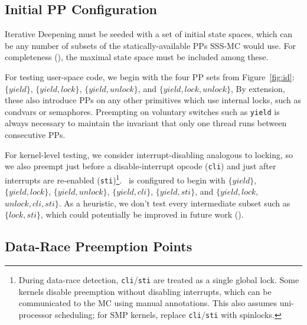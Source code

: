 
\subsection{Initial PP Configuration}
\label{sec:initial-pp}

Iterative Deepening must be seeded with a set of initial state spaces,
which can be any number of subsets of the statically-available PPs SSS-MC would use.
For completeness (\sect{\ref{sec:totalverif}}), the maximal state space must be included among these.

For testing user-space code, we begin with the four PP sets from Figure~\ref{fig:id}:
$\{yield\}$,
$\{yield,lock\}$,
$\{yield,unlock\}$,
and $\{yield,lock,unlock\}$,
By extension, these also introduce PPs on any other primitives
which use
internal locks,
such as condvars or semaphores.
Preempting on voluntary switches such as {\tt yield} is always necessary to maintain the invariant that only one thread runs between consecutive PPs.

For kernel-level testing, we consider interrupt-disabling analogous to locking,
so we also preempt just before a disable-interrupt opcode ({\tt cli}) and just after interrupts are re-enabled ({\tt sti})\footnote{
During data-race detection, {\tt cli}/{\tt sti} are treated as a single global lock.
Some kernels disable preemption without disabling interrupts,
which can be communicated to the MC using manual annotations. %
This also assumes uni-processor scheduling; for SMP kernels, replace {\tt cli}/{\tt sti} with spinlocks.}.
\quicksand~is configured to begin with
$\{yield\}$,
$\{yield,lock\}$,
$\{yield,unlock\}$,
$\{yield,cli\}$,
$\{yield,sti\}$,
and $\{yield,lock,$ $unlock,cli,sti\}$.
As a heuristic, we don't test every intermediate subset such as $\{lock,sti\}$,
which could potentially be improved in future work (\sect{\ref{sec:future}}).


\subsection{Data-Race Preemption Points}
\label{sec:classifying}


